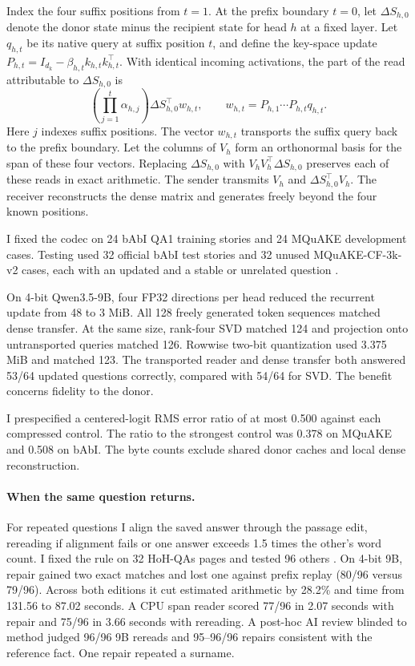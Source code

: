 \documentclass[letterpaper]{article}
\begin{document}
Index the four suffix positions from $t=1$. At the prefix boundary $t=0$, let $\Delta S_{h,0}$ denote the donor state minus the recipient state for head $h$ at a fixed layer. Let $q_{h,t}$ be its
native query at suffix position $t$, and define the key-space update
$P_{h,t}=I_{d_k}-\beta_{h,t}k_{h,t}k_{h,t}^{\top}$. With identical
incoming activations, the part of the read attributable to $\Delta S_{h,0}$ is
\begin{equation}
\left(\prod_{j=1}^{t}\alpha_{h,j}\right) \Delta S_{h,0}^{\top} w_{h,t},
\qquad w_{h,t}=P_{h,1}\cdots P_{h,t}q_{h,t}.
\end{equation}
Here $j$ indexes suffix positions. The vector $w_{h,t}$ transports the suffix query back to the prefix boundary. Let the columns of $V_h$ form an orthonormal
basis for the span of these four vectors.
Replacing $\Delta S_{h,0}$ with $V_hV_h^{\top}\Delta S_{h,0}$ preserves each of these reads
in exact arithmetic. The sender transmits $V_h$ and $\Delta S_{h,0}^{\top}V_h$.
The receiver reconstructs the dense matrix and generates freely beyond the four known positions.

I fixed the codec on 24 bAbI QA1 training stories and 24 MQuAKE development cases. Testing used 32 official bAbI test stories and 32 unused MQuAKE-CF-3k-v2 cases, each with an updated and a stable or unrelated question \citep{weston2016,zhong2023}.

On 4-bit Qwen3.5-9B, four FP32 directions per head reduced the recurrent
update from 48 to 3 MiB. All 128 freely generated token sequences
matched dense transfer. At the same size, rank-four SVD matched 124
and projection onto untransported queries matched 126. Rowwise two-bit
quantization used 3.375 MiB and matched 123. The transported reader
and dense transfer both answered 53/64 updated questions correctly,
compared with 54/64 for SVD. The benefit concerns fidelity to the donor.

I prespecified a centered-logit RMS error ratio of at most 0.500 against
each compressed control. The ratio to the strongest control was 0.378
on MQuAKE and 0.508 on bAbI. The byte counts exclude shared donor caches
and local dense reconstruction.

\paragraph{When the same question returns.}
For repeated questions I align the saved answer through the passage edit, rereading if alignment fails or one answer exceeds 1.5 times the other’s word count. I fixed the rule on 32 HoH-QAs pages and tested 96 others \citep{ouyang2025}. On 4-bit 9B,
repair gained two exact matches and lost one against prefix replay
(80/96 versus 79/96). Across both editions it cut estimated arithmetic
by 28.2\% and time from 131.56 to 87.02 seconds. A CPU span reader
scored 77/96 in 2.07 seconds with repair and 75/96 in 3.66 seconds
with rereading. A post-hoc AI review blinded to method judged 96/96
9B rereads and 95--96/96 repairs consistent with the reference fact.
One repair repeated a surname.
\end{document}
